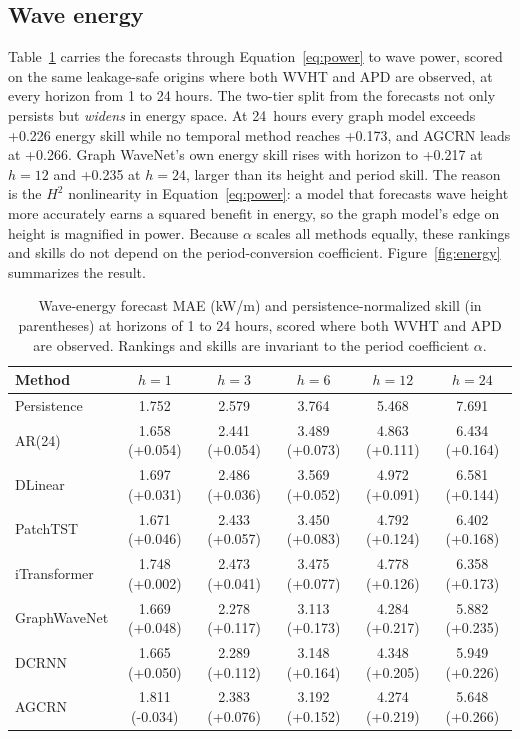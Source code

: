 \documentclass[11pt]{article}
\begin{document}
\subsection{Wave energy}
Table~\ref{tab:energy} carries the forecasts through Equation~\ref{eq:power} to
wave power, scored on the same leakage-safe origins where both WVHT and APD are
observed, at every horizon from 1 to 24 hours. The two-tier split from the
forecasts not only persists but \emph{widens} in energy space. At 24~hours every
graph model exceeds +0.226 energy skill while no temporal method reaches
+0.173, and AGCRN leads at +0.266. Graph WaveNet's own energy skill
rises with horizon to +0.217 at $h{=}12$ and +0.235 at $h{=}24$, larger
than its height and period skill. The reason is the $H^{2}$ nonlinearity in
Equation~\ref{eq:power}: a model that forecasts wave height more accurately earns
a squared benefit in energy, so the graph model's edge on height is magnified in
power. Because $\alpha$ scales all methods equally, these rankings and skills do
not depend on the period-conversion coefficient. Figure~\ref{fig:energy}
summarizes the result.

\begin{table}[t]
\centering
\caption{Wave-energy forecast MAE (kW/m) and persistence-normalized skill (in
parentheses) at horizons of 1 to 24 hours, scored where both WVHT and APD are
observed. Rankings and skills are invariant to the period coefficient $\alpha$.}
\label{tab:energy}
\small
\begin{tabular}{l ccccc}
\toprule
Method & $h{=}1$ & $h{=}3$ & $h{=}6$ & $h{=}12$ & $h{=}24$\\
\midrule
Persistence & 1.752 & 2.579 & 3.764 & 5.468 & 7.691 \\
AR(24) & 1.658 (+0.054) & 2.441 (+0.054) & 3.489 (+0.073) & 4.863 (+0.111) & 6.434 (+0.164) \\
DLinear & 1.697 (+0.031) & 2.486 (+0.036) & 3.569 (+0.052) & 4.972 (+0.091) & 6.581 (+0.144) \\
PatchTST & 1.671 (+0.046) & 2.433 (+0.057) & 3.450 (+0.083) & 4.792 (+0.124) & 6.402 (+0.168) \\
iTransformer & 1.748 (+0.002) & 2.473 (+0.041) & 3.475 (+0.077) & 4.778 (+0.126) & 6.358 (+0.173) \\
GraphWaveNet & 1.669 (+0.048) & 2.278 (+0.117) & 3.113 (+0.173) & 4.284 (+0.217) & 5.882 (+0.235) \\
DCRNN & 1.665 (+0.050) & 2.289 (+0.112) & 3.148 (+0.164) & 4.348 (+0.205) & 5.949 (+0.226) \\
AGCRN & 1.811 (-0.034) & 2.383 (+0.076) & 3.192 (+0.152) & 4.274 (+0.219) & 5.648 (+0.266) \\
\bottomrule
\end{tabular}
\end{table}
\end{document}
